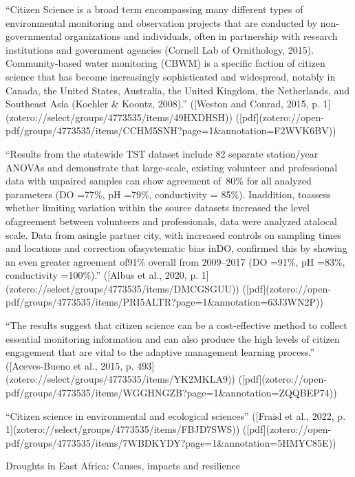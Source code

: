 {“Citizen Science is a broad term encompassing many different types of environmental monitoring and observation projects that are conducted by non-governmental organizations and individuals, often in partnership with research institutions and government agencies (Cornell Lab of Ornithology, 2015). Community-based water monitoring (CBWM) is a specific faction of citizen science that has become increasingly sophisticated and widespread, notably in Canada, the United States, Australia, the United Kingdom, the Netherlands, and Southeast Asia (Koehler & Koontz, 2008).” ([Weston and Conrad, 2015, p. 1](zotero://select/groups/4773535/items/49HXDHSH)) ([pdf](zotero://open-pdf/groups/4773535/items/CCHM5SNH?page=1&annotation=F2WVK6BV))

“Results from the statewide TST dataset include 82 separate station/year ANOVAs and demonstrate that large-scale, existing volunteer and professional data with unpaired samples can show agreement of~80\% for all analyzed parameters (DO =77\%, pH =79\%, conductivity = 85\%). Inaddition, toassess whether limiting variation within the source datasets increased the level ofagreement between volunteers and professionals, data were analyzed atalocal scale. Data from asingle partner city, with increased controls on sampling times and locations and correction ofasystematic bias inDO, confirmed this by showing an even greater agreement of91\% overall from 2009–2017 (DO =91\%, pH =83\%, conductivity =100\%).” ([Albus et al., 2020, p. 1](zotero://select/groups/4773535/items/DMCGSGUU)) ([pdf](zotero://open-pdf/groups/4773535/items/PRI5ALTR?page=1\&annotation=63J3WN2P))

“The results suggest that citizen science can be a cost-effective method to collect essential monitoring information and can also produce the high levels of citizen engagement that are vital to the adaptive management learning process.” ([Aceves-Bueno et al., 2015, p. 493](zotero://select/groups/4773535/items/YK2MKLA9)) ([pdf](zotero://open-pdf/groups/4773535/items/WGGHNGZB?page=1&annotation=ZQQBEP74))

“Citizen science in environmental and ecological sciences” ([Fraisl et al., 2022, p. 1](zotero://select/groups/4773535/items/FBJD7SWS)) ([pdf](zotero://open-pdf/groups/4773535/items/7WBDKYDY?page=1&annotation=5HMYC85E))

Droughts in East Africa: Causes, impacts and resilience


}
